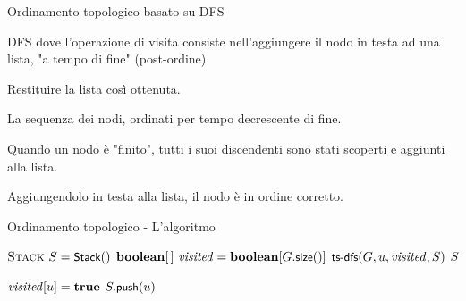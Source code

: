 \begin{frame}{Ordinamento topologico basato su DFS}

\vspace{-9pt}
\begin{myboxtitle}[Algoritmo]
\BI
\item DFS dove l'operazione di visita consiste nell'aggiungere il nodo in testa ad una lista, \alert{"a tempo di fine"} (post-ordine)
\item Restituire la lista così ottenuta.
\EI
\end{myboxtitle}

\begin{myboxtitle}[Output]
\BI
\item La sequenza dei nodi, ordinati per tempo decrescente di fine.
\EI
\end{myboxtitle}

\begin{myboxtitle}
\pause
\BI
\item Quando un nodo è "finito", tutti i suoi discendenti sono stati scoperti e aggiunti alla lista. 
\item Aggiungendolo in testa alla lista, il nodo è in ordine corretto.
\EI
\end{myboxtitle}

\end{frame}

\begin{frame}[shrink=10]{Ordinamento topologico - L'algoritmo}

\vspace{-12pt}
\begin{Procedure}
\caption[A]{\Stack\ \topsort(\Graph $G$)}
$\textsc{Stack}\ S = \textsf{{\small Stack}}()$\;
$\BOOLEAN[\,]\ \mmark = \BOOLEAN[G.\fontproc{size}()]$\;
{
  \If{\NOT\ $\mmark[u]$}
  {
    $\textsf{{\small ts-dfs}}(G, u, \mathit{visited}, S)$\;
  }
}
\Return $S$\;
\end{Procedure}

\vspace{-16pt}
\begin{Procedure}
\caption[A]{\topsortdfs(\Graph $G$, \Node\ $u$, $\BOOLEAN[\,]\ \mmark$, \Stack $S$)}
$\mmark[u] = \TRUE$\;
{
}
$S.\textsf{{\small push}}(u)$\;
\end{Procedure}

\end{frame}

